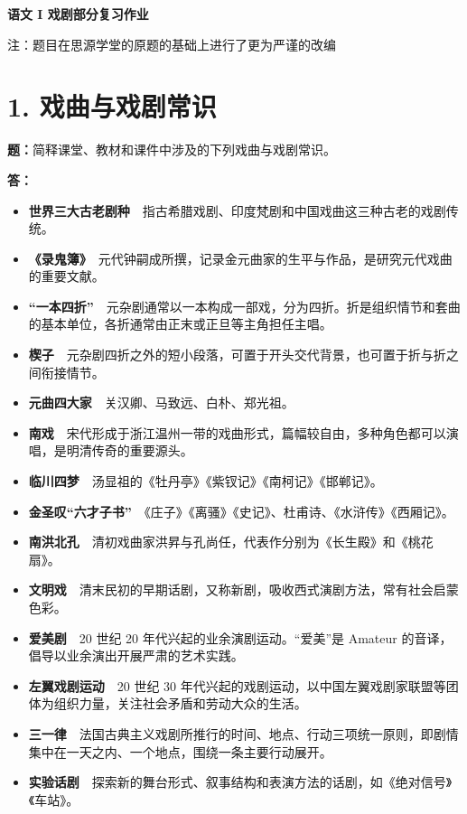 \documentclass[11pt,a4paper,fontset=windows]{ctexart}
\newenvironment{answer}{\par\begingroup\answerlatin\answercjk}{\par\endgroup}
\begin{document}
\begin{center}
  {\LARGE\bfseries 语文 I 戏剧部分复习作业\par}
  {\small 注：题目在思源学堂的原题的基础上进行了更为严谨的改编\par}
\end{center}
\vspace{0.3em}

\section*{1. 戏曲与戏剧常识}

\textbf{题：}简释课堂、教材和课件中涉及的下列戏曲与戏剧常识。

\begin{answer}
\textbf{答：}

\begin{itemize}
\item \textbf{世界三大古老剧种}　指古希腊戏剧、印度梵剧和中国戏曲这三种古老的戏剧传统。
\item \textbf{《录鬼簿》}　元代钟嗣成所撰，记录金元曲家的生平与作品，是研究元代戏曲的重要文献。
\item \textbf{“一本四折”}　元杂剧通常以一本构成一部戏，分为四折。折是组织情节和套曲的基本单位，各折通常由正末或正旦等主角担任主唱。
\item \textbf{楔子}　元杂剧四折之外的短小段落，可置于开头交代背景，也可置于折与折之间衔接情节。
\item \textbf{元曲四大家}　关汉卿、马致远、白朴、郑光祖。
\item \textbf{南戏}　宋代形成于浙江温州一带的戏曲形式，篇幅较自由，多种角色都可以演唱，是明清传奇的重要源头。
\item \textbf{临川四梦}　汤显祖的《牡丹亭》《紫钗记》《南柯记》《邯郸记》。
\item \textbf{金圣叹“六才子书”}　《庄子》《离骚》《史记》、杜甫诗、《水浒传》《西厢记》。
\item \textbf{南洪北孔}　清初戏曲家洪昇与孔尚任，代表作分别为《长生殿》和《桃花扇》。
\item \textbf{文明戏}　清末民初的早期话剧，又称新剧，吸收西式演剧方法，常有社会启蒙色彩。
\item \textbf{爱美剧}　20 世纪 20 年代兴起的业余演剧运动。“爱美”是 Amateur 的音译，倡导以业余演出开展严肃的艺术实践。
\item \textbf{左翼戏剧运动}　20 世纪 30 年代兴起的戏剧运动，以中国左翼戏剧家联盟等团体为组织力量，关注社会矛盾和劳动大众的生活。
\item \textbf{三一律}　法国古典主义戏剧所推行的时间、地点、行动三项统一原则，即剧情集中在一天之内、一个地点，围绕一条主要行动展开。
\item \textbf{实验话剧}　探索新的舞台形式、叙事结构和表演方法的话剧，如《绝对信号》《车站》。
\end{itemize}

\end{answer}
\end{document}
